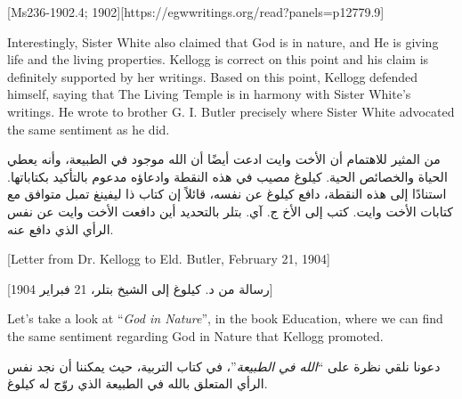 [Ms236-1902.4; 1902][https://egwwritings.org/read?panels=p12779.9]


Interestingly, Sister White also claimed that God is in nature, and He is giving life and the living properties. Kellogg is correct on this point and his claim is definitely supported by her writings. Based on this point, Kellogg defended himself, saying that The Living Temple is in harmony with Sister White’s writings. He wrote to brother G. I. Butler precisely where Sister White advocated the same sentiment as he did.


من المثير للاهتمام أن الأخت وايت ادعت أيضًا أن الله موجود في الطبيعة، وأنه يعطي الحياة والخصائص الحية. كيلوغ مصيب في هذه النقطة وادعاؤه مدعوم بالتأكيد بكتاباتها. استنادًا إلى هذه النقطة، دافع كيلوغ عن نفسه، قائلاً إن كتاب ذا ليفينغ تمبل متوافق مع كتابات الأخت وايت. كتب إلى الأخ ج. آي. بتلر بالتحديد أين دافعت الأخت وايت عن نفس الرأي الذي دافع عنه.


[Letter from Dr. Kellogg to Eld. Butler, February 21, 1904]


[رسالة من د. كيلوغ إلى الشيخ بتلر، 21 فبراير 1904]


Let’s take a look at “\textit{God in Nature}”, in the book Education, where we can find the same sentiment regarding God in Nature that Kellogg promoted.


دعونا نلقي نظرة على “\textit{الله في الطبيعة}”، في كتاب التربية، حيث يمكننا أن نجد نفس الرأي المتعلق بالله في الطبيعة الذي روّج له كيلوغ.


